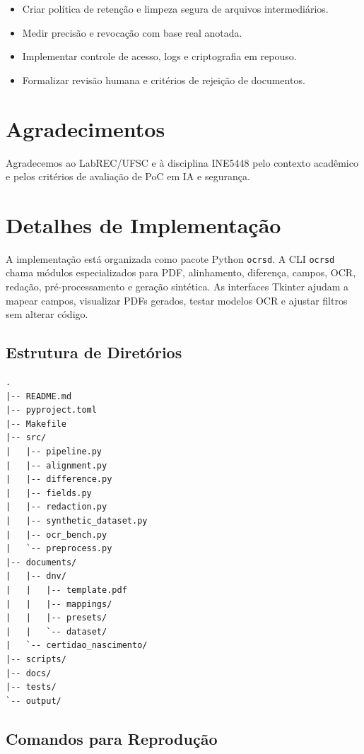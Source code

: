 \documentclass[12pt,a4paper]{article}
\begin{document}
\begin{itemize}
    \item{} Criar política de retenção e limpeza segura de arquivos intermediários.
    \item{} Medir precisão e revocação com base real anotada.
    \item{} Implementar controle de acesso, logs e criptografia em repouso.
    \item{} Formalizar revisão humana e critérios de rejeição de documentos.
\end{itemize}

\section*{Agradecimentos}

Agradecemos ao LabREC/UFSC e à disciplina INE5448 pelo contexto acadêmico e pelos critérios de avaliação de PoC em IA e segurança.

\nocite{*}
\printbibliography

\appendix

\section{Detalhes de Implementação}
\label{app:implementacao}

A implementação está organizada como pacote Python \texttt{ocrsd}. A CLI \texttt{ocrsd} chama módulos especializados para PDF, alinhamento, diferença, campos, OCR, redação, pré-processamento e geração sintética. As interfaces Tkinter ajudam a mapear campos, visualizar PDFs gerados, testar modelos OCR e ajustar filtros sem alterar código.

\subsection{Estrutura de Diretórios}

\begin{verbatim}
.
|-- README.md
|-- pyproject.toml
|-- Makefile
|-- src/
|   |-- pipeline.py
|   |-- alignment.py
|   |-- difference.py
|   |-- fields.py
|   |-- redaction.py
|   |-- synthetic_dataset.py
|   |-- ocr_bench.py
|   `-- preprocess.py
|-- documents/
|   |-- dnv/
|   |   |-- template.pdf
|   |   |-- mappings/
|   |   |-- presets/
|   |   `-- dataset/
|   `-- certidao_nascimento/
|-- scripts/
|-- docs/
|-- tests/
`-- output/
\end{verbatim}

\subsection{Comandos para Reprodução}
\end{document}

